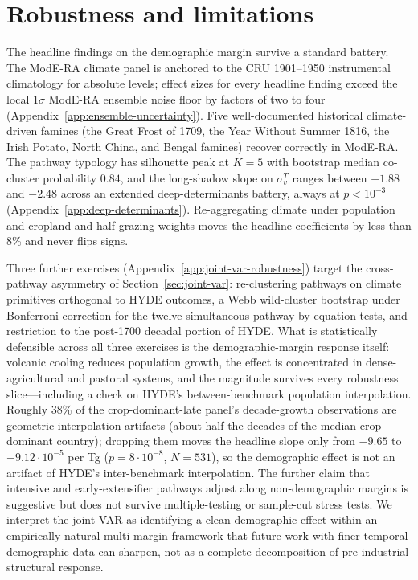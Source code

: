 \documentclass[11pt,letterpaper]{article}
\begin{document}
\section{Robustness and limitations}
\label{sec:robustness}

The headline findings on the demographic margin survive a standard battery. The ModE-RA climate panel is anchored to the CRU 1901--1950 instrumental climatology for absolute levels; effect sizes for every headline finding exceed the local $1\sigma$ ModE-RA ensemble noise floor by factors of two to four (Appendix~\ref{app:ensemble-uncertainty}). Five well-documented historical climate-driven famines (the Great Frost of 1709, the Year Without Summer 1816, the Irish Potato, North China, and Bengal famines) recover correctly in ModE-RA. The pathway typology has silhouette peak at $K=5$ with bootstrap median co-cluster probability $0.84$, and the long-shadow slope on $\sigma_v^T$ ranges between $-1.88$ and $-2.48$ across an extended deep-determinants battery, always at $p<10^{-3}$ (Appendix~\ref{app:deep-determinants}). Re-aggregating climate under population and cropland-and-half-grazing weights moves the headline coefficients by less than 8\% and never flips signs.

Three further exercises (Appendix~\ref{app:joint-var-robustness}) target the cross-pathway asymmetry of Section~\ref{sec:joint-var}: re-clustering pathways on climate primitives orthogonal to HYDE outcomes, a Webb wild-cluster bootstrap under Bonferroni correction for the twelve simultaneous pathway-by-equation tests, and restriction to the post-1700 decadal portion of HYDE. What is statistically defensible across all three exercises is the demographic-margin response itself: volcanic cooling reduces population growth, the effect is concentrated in dense-agricultural and pastoral systems, and the magnitude survives every robustness slice---including a check on HYDE's between-benchmark population interpolation. Roughly 38\% of the crop-dominant-late panel's decade-growth observations are geometric-interpolation artifacts (about half the decades of the median crop-dominant country); dropping them moves the headline slope only from $-9.65$ to $-9.12\!\cdot\!10^{-5}$ per Tg ($p=8\!\cdot\!10^{-8}$, $N=531$), so the demographic effect is not an artifact of HYDE's inter-benchmark interpolation. The further claim that intensive and early-extensifier pathways adjust along non-demographic margins is suggestive but does not survive multiple-testing or sample-cut stress tests. We interpret the joint VAR as identifying a clean demographic effect within an empirically natural multi-margin framework that future work with finer temporal demographic data can sharpen, not as a complete decomposition of pre-industrial structural response.
\end{document}
